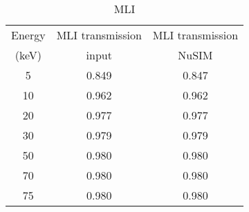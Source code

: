 \begin{table}[h]
\caption{MLI}
\begin{center}
\begin{tabular}{|c|c|c|}
\hline
Energy & MLI transmission & MLI transmission \\
(keV) & input & NuSIM \\
\hline
\hline
5 & 0.849 & 0.847 \\
10 & 0.962 & 0.962\\
20 & 0.977 & 0.977\\
30 & 0.979 & 0.979\\
50 & 0.980 & 0.980 \\
70 & 0.980 & 0.980\\ 
75 & 0.980 & 0.980\\ 
\hline
\end{tabular}
\end{center}
\label{mli}
\end{table}%


%